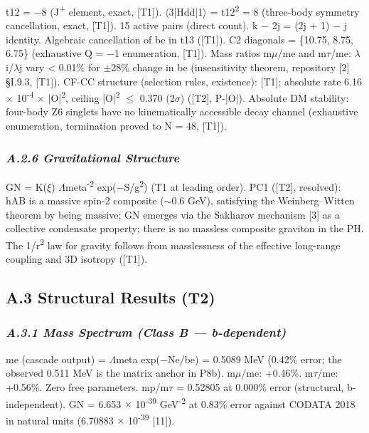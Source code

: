 \documentclass[11pt,letterpaper]{article}
\begin{document}
\noindent t12 = $-$8 (J\textsuperscript{+} element, exact, [T1]). $\langle$3|Hdd|1$\rangle$ = t12\textsuperscript{2} = 8 (three-body symmetry cancellation, exact, [T1]). 15 active pairs (direct count). k $-$ 2j = (2j + 1) $-$ j identity. Algebraic cancellation of be in t13 ([T1]). C2 diagonals = \{10.75, 8.75, 6.75\} (exhaustive Q = $-$1 enumeration, [T1]). Mass ratios m$\mu$/me and m$\tau$/me: $\lambda$i/$\lambda$j vary < 0.01\% for $\pm$28\% change in be (insensitivity theorem, repository [2] §I.9.3, [T1]). CF-CC structure (selection rules, existence): [T1]; absolute rate 6.16 $\times$ 10\textsuperscript{-4} $\times$ |O|\textsuperscript{2}, ceiling |O|\textsuperscript{2} $\le$ 0.370 (2$\sigma$) ([T2], P-|O|). Absolute DM stability: four-body Z6 singlets have no kinematically accessible decay channel (exhaustive enumeration, termination proved to N = 48, [T1]).

\subsubsection*{\itshape A.2.6  Gravitational Structure}

\noindent GN = K($\xi$) $\Lambda$meta\textsuperscript{-2} exp($-$S/g\textsuperscript{2}) (T1 at leading order). PC1 ([T2], resolved): hAB is a massive spin-2 composite ($\sim$0.6 GeV), satisfying the Weinberg--Witten theorem by being massive; GN emerges via the Sakharov mechanism [3] as a collective condensate property; there is no massless composite graviton in the PH. The 1/r\textsuperscript{2} law for gravity follows from masslessness of the effective long-range coupling and 3D isotropy ([T1]).

\subsection*{A.3  Structural Results (T2)}

\subsubsection*{\itshape A.3.1  Mass Spectrum (Class B --- b-dependent)}

\noindent me (cascade output) = $\Lambda$meta exp($-$Ne/be) = 0.5089 MeV (0.42\% error; the observed 0.511 MeV is the matrix anchor in P8b). m$\mu$/me: +0.46\%. m$\tau$/me: +0.56\%. Zero free parameters. mp/m$\tau$ = 0.52805 at 0.000\% error (structural, b-independent). GN = 6.653 $\times$ 10\textsuperscript{-39} GeV\textsuperscript{-2} at 0.83\% error against CODATA 2018 in natural units (6.70883 $\times$ 10\textsuperscript{-39} [11]).
\end{document}
